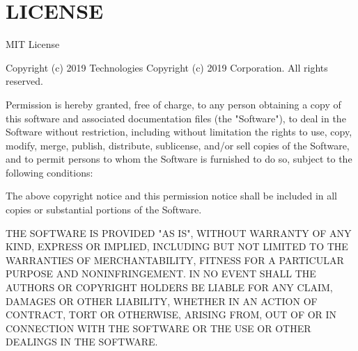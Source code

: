\chapter{LICENSE}
\hypertarget{md__hey_tea_9_2_library_2_package_cache_2com_8unity_8ide_8visualstudio_0d2_80_820_2_l_i_c_e_n_s_e}{}\label{md__hey_tea_9_2_library_2_package_cache_2com_8unity_8ide_8visualstudio_0d2_80_820_2_l_i_c_e_n_s_e}
MIT License

Copyright (c) 2019  Technologies Copyright (c) 2019  Corporation. All rights reserved.

Permission is hereby granted, free of charge, to any person obtaining a copy of this software and associated documentation files (the "{}\+Software"{}), to deal in the Software without restriction, including without limitation the rights to use, copy, modify, merge, publish, distribute, sublicense, and/or sell copies of the Software, and to permit persons to whom the Software is furnished to do so, subject to the following conditions\+:

The above copyright notice and this permission notice shall be included in all copies or substantial portions of the Software.

THE SOFTWARE IS PROVIDED "{}\+AS IS"{}, WITHOUT WARRANTY OF ANY KIND, EXPRESS OR IMPLIED, INCLUDING BUT NOT LIMITED TO THE WARRANTIES OF MERCHANTABILITY, FITNESS FOR A PARTICULAR PURPOSE AND NONINFRINGEMENT. IN NO EVENT SHALL THE AUTHORS OR COPYRIGHT HOLDERS BE LIABLE FOR ANY CLAIM, DAMAGES OR OTHER LIABILITY, WHETHER IN AN ACTION OF CONTRACT, TORT OR OTHERWISE, ARISING FROM, OUT OF OR IN CONNECTION WITH THE SOFTWARE OR THE USE OR OTHER DEALINGS IN THE SOFTWARE. 